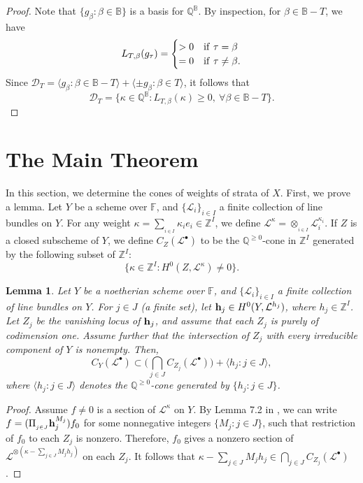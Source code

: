 \documentclass[11pt,pdflatex]{amsart}
\theoremstyle{plain}
\newtheorem{lemma}[theorem]{Lemma}
\theoremstyle{definition}
\newcommand{\FF}{\mathbf{F}}
\newcommand{\QQ}{\mathbf{Q}}
\newcommand{\ZZ}{\mathbf{Z}}
\theoremstyle{plain}
\theoremstyle{definition}
\theoremstyle{remark}
\numberwithin{equation}{section}
\numberwithin{figure}{section} \numberwithin{table}{subsection}
\newcommand{\calD}{{\mathcal{D}}}
\newcommand{\calL}{{\mathcal{L}}}
\def\BB{\mathbb{B}}
\def\FF{\mathbb{F}}
\def\QQ{\mathbb{Q}}
\def\ZZ{\mathbb{Z}}
\begin{document}
\begin{proof}   Note that  $\{g_\beta: \beta \in \BB\}$ is a basis for $\QQ^\BB$. By inspection, for $\beta \in \BB-T$, we have 
\[
L_{T,\beta}(g_\tau)=\begin{cases} >0 & {\rm if}\ \tau=\beta\\
=0 & {\rm if}\ \tau\neq \beta.
\end{cases}
\]
Since $\calD_T=\langle g_\beta: \beta \in \BB-T \rangle + \langle \pm g_\beta: \beta \in T\rangle$, it follows that $$\calD_T=\{\kappa \in \QQ^\BB: L_{T,\beta}(\kappa) \geq 0,\ \forall \beta \in \BB-T\}.$$
\end{proof}


  






 
\section{The Main Theorem}\label{section: main}

In this section, we determine the cones of weights of strata of $X$.  First, we prove a lemma. Let $Y$ be a scheme over $\FF$, and $\{\calL_i\}_{i\in I}$  a finite collection of line bundles on $Y$. For any weight $\kappa=\sum_{_{i \in I}} \kappa_ie_i \in \ZZ^I$, we define $\calL^{\kappa}=\otimes_{_{i \in I}} \calL_i^{ \kappa_i}$. If $Z$ is a closed subscheme of $Y$, we define  $C_Z(\calL^\bullet)$ to be the $\QQ^{\geq 0}$-cone in $\ZZ^I$ generated by the following subset of $\ZZ^I$:
$$\{\kappa \in \ZZ^I  : H^0(Z, \calL^{\kappa}) \neq 0 \}.$$


\begin{lemma}\label{lemma: intsum}
Let $Y$ be a noetherian scheme over $\FF$, and $\{\calL_i\}_{i\in I}$ a finite collection of line bundles on $Y$.  For $j \in J$ (a finite set), let  ${\bf h}_j \in H^0(Y, \calL^{h_j})$, where $h_j \in  \ZZ^I$.  Let $Z_j$ be the vanishing locus of ${\bf h}_j$, and assume that each $Z_j$ is purely of codimension one. Assume further that the intersection of  $Z_j$ with every irreducible component of $Y$ is nonempty. Then, $$C_Y(\calL^\bullet) \subset \big( \bigcap_{j \in J} C_{Z_j}(\calL^\bullet) \big)+ \langle h_j: j \in J\rangle,$$
where  $\langle h_j: j \in J\rangle$ denotes the $\QQ^{\geq 0}$-cone generated by $\{h_j: j \in J\}$.
\end{lemma}

\begin{proof} Assume $f\neq 0$ is a section of $\calL^\kappa$ on $Y$. By Lemma 7.2 in \cite{DK2}, we can write $f=(\Pi_{_{j \in J}}{\bf h}_j^{M_j}) f_0$ for some nonnegative integers  $\{M_j: j \in J\}$, such that restriction of $f_0$ to each $Z_j$ is nonzero. Therefore, $f_0$ gives a nonzero section of $\calL^{\otimes (\kappa-\sum_{ j\in J}M_jh_j)}$ on each $Z_j$. It follows that  $\kappa-\sum_{j\in J}M_jh_j\in \bigcap_{j \in J} C_{Z_j}(\calL^\bullet)$. 
\end{proof}
 
\end{document}
